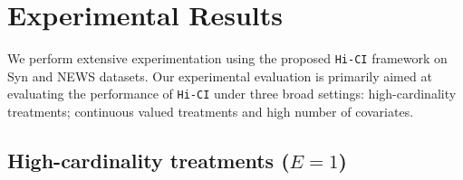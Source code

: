 \documentclass[twoside,11pt]{article}
\begin{document}
\section{Experimental Results}
\label{sec:exptts}
We perform extensive experimentation using the proposed \texttt{Hi-CI} framework on \textsf{Syn} and \textsf{NEWS} datasets. Our experimental evaluation is primarily aimed at evaluating the performance of \texttt{Hi-CI} under three broad settings: high-cardinality treatments; continuous valued treatments and high number of covariates.

\subsection{High-cardinality treatments ($E=1$)}
\end{document}
